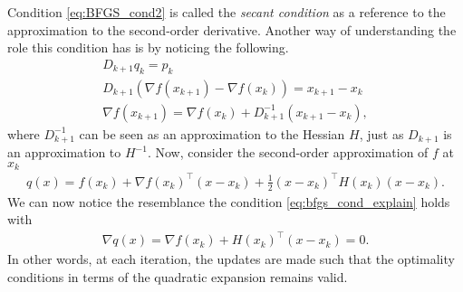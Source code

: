 Condition \eqref{eq:BFGS_cond2} is called the \emph{secant condition} as a reference to the approximation to the second-order derivative. Another way of understanding the role this condition has is by noticing the following.
\begin{align}
	D_{k+1} q_k  = p_k \nonumber \\
	D_{k+1}(\nabla f(x_{k+1}) - \nabla f(x_k)) = x_{k+1} - x_k \nonumber \\
	\nabla f(x_{k+1}) = \nabla f(x_k) + D_{k+1}^{-1}(x_{k+1} - x_k) \label{eq:bfgs_cond_explain}, 
\end{align}
%
where $D_{k+1}^{-1}$ can be seen as an approximation to the Hessian $H$, just as $D_{k+1}$ is an approximation to $H^{-1}$. Now, consider the second-order approximation of $f$ at $x_k$
\begin{align*}
	q(x) = f(x_k) + \nabla f(x_k)^\top(x -x_k) + \frac{1}{2}(x - x_k)^\top H(x_k)(x - x_k). 	
\end{align*}
We can now notice the resemblance the condition \eqref{eq:bfgs_cond_explain} holds with
%
\begin{align*}
	\nabla q(x) = \nabla f(x_k) + H(x_k)^\top(x - x_k) = 0.	
\end{align*}
% 
In other words, at each iteration, the updates are made such that the optimality conditions in terms of the quadratic expansion remains valid. 

